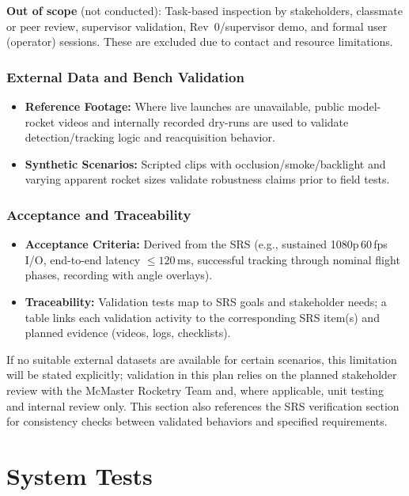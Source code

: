 \documentclass[12pt, titlepage]{article}
\begin{document}
\noindent\textbf{Out of scope} (not conducted): Task-based inspection by
stakeholders, classmate or peer review, supervisor validation, Rev~0/supervisor
demo, and formal user (operator) sessions. These are excluded due to contact
and resource limitations.

\subsubsection*{External Data and Bench Validation}
\begin{itemize}
  \item \textbf{Reference Footage:} Where live launches are unavailable,
        public model-rocket videos and internally recorded dry-runs are used
        to validate detection/tracking logic and reacquisition behavior.
  \item \textbf{Synthetic Scenarios:} Scripted clips with
        occlusion/smoke/backlight and varying apparent rocket sizes validate
        robustness claims prior to field tests.
\end{itemize}

\subsubsection*{Acceptance and Traceability}
\begin{itemize}
  \item \textbf{Acceptance Criteria:} Derived from the SRS (e.g.,
        sustained 1080p\,60\,fps I/O, end-to-end latency $\leq 120$\,ms,
        successful tracking through nominal flight phases, recording with
        angle overlays).
  \item \textbf{Traceability:} Validation tests map to SRS goals and
        stakeholder needs; a table links each validation activity to the
        corresponding SRS item(s) and planned evidence (videos, logs, checklists).
\end{itemize}

\noindent
If no suitable external datasets are available for certain scenarios,
this limitation will be stated explicitly; validation in this plan relies
on the planned stakeholder review with the McMaster Rocketry Team and, where
applicable, unit testing and internal review only. This section also references the SRS verification section for
consistency checks between validated behaviors and specified requirements.

\section{System Tests}
\end{document}
